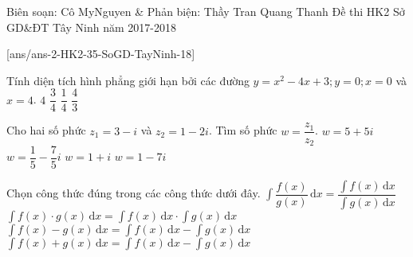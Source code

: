 \begin{name}
		{Biên soạn: Cô MyNguyen \& Phản biện: Thầy Tran Quang Thanh}
		{Đề thi HK2 Sở GD\&ĐT Tây Ninh năm 2017-2018}
	\end{name}
	\setcounter{ex}{0}\setcounter{bt}{0}
	[ans/ans-2-HK2-35-SoGD-TayNinh-18]
	\begin{ex}%
		Tính diện tích hình phẳng giới hạn bởi các đường $y=x^2-4x+3; y=0; x=0$ và $x=4$.
		\choice
		{\True $4$}
		{$\dfrac{3}{4}$}
		{$\dfrac{1}{4}$}
		{$\dfrac{4}{3}$}
	\end{ex}
	\begin{ex}%
		Cho hai số phức $z_1=3-i$ và $z_2=1-2i$. Tìm số phức $w=\dfrac{z_1}{z_2}$.		
		\choice
		{$w=5+5i$}
		{$w=\dfrac{1}{5}-\dfrac{7}{5}i$}
		{\True $w=1+i$}
		{$w=1-7i$}
	\end{ex}
	\begin{ex}%
		Chọn công thức đúng trong các công thức dưới đây.		
		\choice
		{$\displaystyle\int \dfrac{f(x)}{g(x)} \mathrm{\,d}x=\dfrac{\displaystyle\int f(x) \mathrm{\,d}x}{\displaystyle\int g(x) \mathrm{\,d}x}$}
		{$\displaystyle\int f(x) \cdot g(x) \mathrm{\,d}x=\displaystyle\int f(x) \mathrm{\,d}x\cdot \displaystyle\int g(x) \mathrm{\,d}x$}
		{\True $\displaystyle\int f(x) - g(x) \mathrm{\,d}x=\displaystyle\int f(x) \mathrm{\,d}x- \displaystyle\int g(x) \mathrm{\,d}x$}
		{$\displaystyle\int f(x) + g(x) \mathrm{\,d}x=\displaystyle\int f(x) \mathrm{\,d}x- \displaystyle\int g(x) \mathrm{\,d}x$}
	\end{ex}
